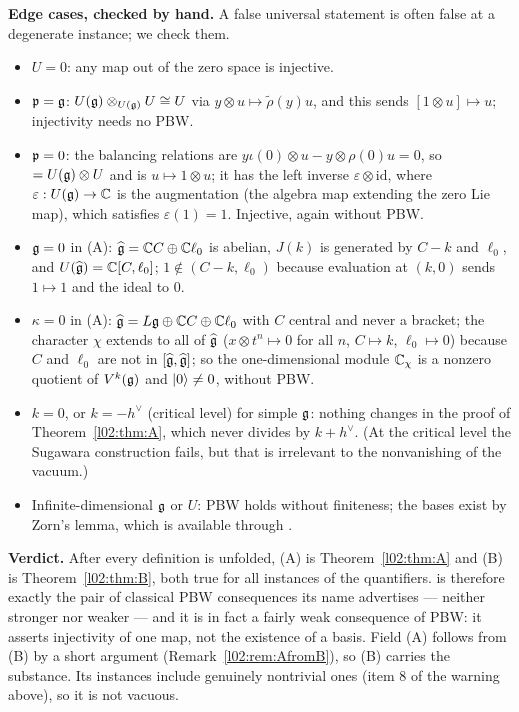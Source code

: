 \begin{dictionary}
\textbf{Edge cases, checked by hand.} A false universal statement is often false at a degenerate
instance; we check them.
\begin{itemize}
\item $U = 0$: any map out of the zero space is injective.
\item $\mathfrak{p} = \mathfrak{g}$: $U(\mathfrak{g})\otimes_{U(\mathfrak{g})}U\cong U$ via $y\otimes u\mapsto\tilde\rho(y)u$, and this
  sends $[1\otimes u]\mapsto u$; injectivity needs no PBW.
\item $\mathfrak{p} = 0$: the balancing relations are $y\iota(0)\otimes u - y\otimes\rho(0)u = 0$, so
   $=U(\mathfrak{g})\otimes U$ and  is $u\mapsto1\otimes u$; it has the left inverse
  $\varepsilon\otimes\mathrm{id}$, where $\varepsilon : U(\mathfrak{g})\to{\mathbb{C}}$ is the augmentation (the algebra map
  extending the zero Lie map), which satisfies $\varepsilon(1) = 1$. Injective, again without PBW.
\item $\mathfrak{g} = 0$ in (A): $\widehat{\mathfrak{g}} = {\mathbb{C}} C\oplus{\mathbb{C}}\ell_0$ is abelian, $J(k)$ is generated by $C-k$ and
  $\ell_0$, and $U(\widehat{\mathfrak{g}}) = {\mathbb{C}}[C,\ell_0]$; $1\notin(C-k,\ell_0)$ because evaluation at $(k,0)$ sends
  $1\mapsto1$ and the ideal to $0$.
\item $\kappa = 0$ in (A): $\widehat{\mathfrak{g}} = L\mathfrak{g}\oplus{\mathbb{C}} C\oplus{\mathbb{C}}\ell_0$ with $C$ central and never a
  bracket; the character $\chi$ extends to all of $\widehat{\mathfrak{g}}$ ($x\otimes t^n\mapsto0$ for all $n$,
  $C\mapsto k$, $\ell_0\mapsto0$) because $C$ and $\ell_0$ are not in $[\widehat{\mathfrak{g}},\widehat{\mathfrak{g}}]$; so the
  one-dimensional module ${\mathbb{C}}_\chi$ is a nonzero quotient of $V^k(\mathfrak{g})$ and $|0\rangle\ne0$, without PBW.
\item $k = 0$, or $k = -h^\vee$ (critical level) for simple $\mathfrak{g}$: nothing changes in the proof of
  Theorem~\ref{l02:thm:A}, which never divides by $k+h^\vee$. (At the critical level the Sugawara
  construction fails, but that is irrelevant to the nonvanishing of the vacuum.)
\item Infinite-dimensional $\mathfrak{g}$ or $U$: PBW holds without finiteness; the bases exist by Zorn's lemma,
  which is available through .
\end{itemize}
\textbf{Verdict.} After every definition is unfolded, (A) is Theorem~\ref{l02:thm:A} and (B) is
Theorem~\ref{l02:thm:B}, both true for all instances of the quantifiers.  is therefore
exactly the pair of classical PBW consequences its name advertises --- neither stronger nor weaker --- and
it is in fact a fairly weak consequence of PBW: it asserts injectivity of one map, not the existence of a
basis. Field (A) follows from (B) by a short argument (Remark~\ref{l02:rem:AfromB}), so (B) carries the substance. Its
instances include genuinely nontrivial ones (item 8 of the warning above), so it is not vacuous.
\end{dictionary}

